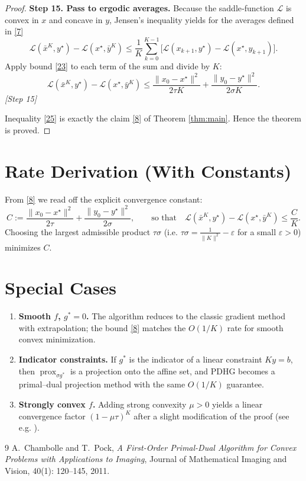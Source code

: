 \documentclass{article}
\newcommand{\prox}{\operatorname{prox}}
\begin{document}
\begin{proof}
\textbf{Step 15. Pass to ergodic averages.}  
Because the saddle‑function $\mathcal{L}$ is convex in $x$ and concave in $y$, Jensen’s inequality yields for the averages defined in \eqref{7}
\[
\mathcal{L}(\bar{x}^{K},y^{\star})-\mathcal{L}(x^{\star},\bar{y}^{K})
\le
\frac{1}{K}\sum_{k=0}^{K-1}\bigl[\mathcal{L}(x_{k+1},y^{\star})-\mathcal{L}(x^{\star},y_{k+1})\bigr].
\tag{24}
\]
Apply bound \eqref{23} to each term of the sum and divide by $K$:
\[
\mathcal{L}(\bar{x}^{K},y^{\star})-\mathcal{L}(x^{\star},\bar{y}^{K})
\le
\frac{\|x_{0}-x^{\star}\|^{2}}{2\tau K}
+\frac{\|y_{0}-y^{\star}\|^{2}}{2\sigma K}.
\tag{25}
\]
\textit{[Step 15]}

Inequality \eqref{25} is exactly the claim \eqref{8} of Theorem \ref{thm:main}.  Hence the theorem is proved. \qedhere
\end{proof}

\section*{Rate Derivation (With Constants)}
From \eqref{8} we read off the explicit convergence constant:
\[
C:=\frac{\|x_{0}-x^{\star}\|^{2}}{2\tau}
      +\frac{\|y_{0}-y^{\star}\|^{2}}{2\sigma},
\qquad
\text{so that}\quad
\mathcal{L}(\bar{x}^{K},y^{\star})-\mathcal{L}(x^{\star},\bar{y}^{K})\le \frac{C}{K}.
\]
Choosing the largest admissible product $\tau\sigma$ (i.e. $\tau\sigma=\frac{1}{\|K\|^{2}}-\varepsilon$ for a small $\varepsilon>0$) minimizes $C$.

\section*{Special Cases}
\begin{enumerate}[label=(\alph*)]
\item \textbf{Smooth $f$, $g^{*}=0$.}  The algorithm reduces to the classic gradient method with extrapolation; the bound \eqref{8} matches the $O(1/K)$ rate for smooth convex minimization.
\item \textbf{Indicator constraints.}  If $g^{*}$ is the indicator of a linear constraint $Ky=b$, then $\prox_{\sigma g^{*}}$ is a projection onto the affine set, and PDHG becomes a primal–dual projection method with the same $O(1/K)$ guarantee.
\item \textbf{Strongly convex $f$.}  Adding strong convexity $\mu>0$ yields a linear convergence factor $(1-\mu\tau)^{K}$ after a slight modification of the proof (see e.g. \cite{chambolle2011first}).
\end{enumerate}

\begin{thebibliography}{9}
A.~Chambolle and T.~Pock,
\newblock \emph{A First-Order Primal-Dual Algorithm for Convex Problems with Applications to Imaging},
\newblock Journal of Mathematical Imaging and Vision, 40(1): 120–145, 2011.
\end{thebibliography}
\end{document}
